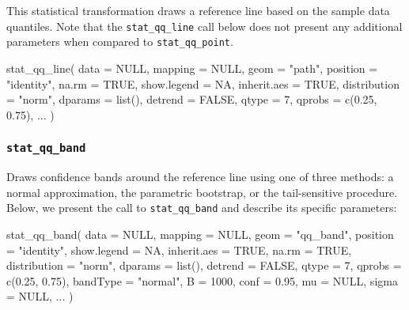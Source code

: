 This statistical transformation draws a reference line based on the
sample data quantiles. Note that the \texttt{stat\_qq\_line} call below
does not present any additional parameters when compared to
\texttt{stat\_qq\_point}.

\begin{Schunk}
\begin{Sinput}
stat_qq_line(
  data = NULL,
  mapping = NULL,
  geom = "path",
  position = "identity",
  na.rm = TRUE,
  show.legend = NA,
  inherit.aes = TRUE,
  distribution = "norm",
  dparams = list(),
  detrend = FALSE,
  qtype = 7,
  qprobs = c(0.25, 0.75),
  ...
  )
\end{Sinput}
\end{Schunk}


\subsubsection{\texorpdfstring{\texttt{stat\_qq\_band}}{stat\_qq\_band}}\label{stat_qq_band}

Draws confidence bands around the reference line using one of three
methods: a normal approximation, the parametric bootstrap, or the
tail-sensitive procedure. Below, we present the call to
\texttt{stat\_qq\_band} and describe its specific parameters:

\begin{Schunk}
\begin{Sinput}
stat_qq_band(
  data = NULL,
  mapping = NULL,
  geom = "qq_band",
  position = "identity",
  show.legend = NA,
  inherit.aes = TRUE,
  na.rm = TRUE,
  distribution = "norm",
  dparams = list(),
  detrend = FALSE,
  qtype = 7,
  qprobs = c(0.25, 0.75),
  bandType = "normal",
  B = 1000,
  conf = 0.95,
  mu = NULL,
  sigma = NULL,
  ...
  )
\end{Sinput}
\end{Schunk}

